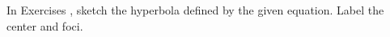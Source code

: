 {\noindent In Exercises}
{, sketch the hyperbola defined by the given equation. Label the center and foci.
}
